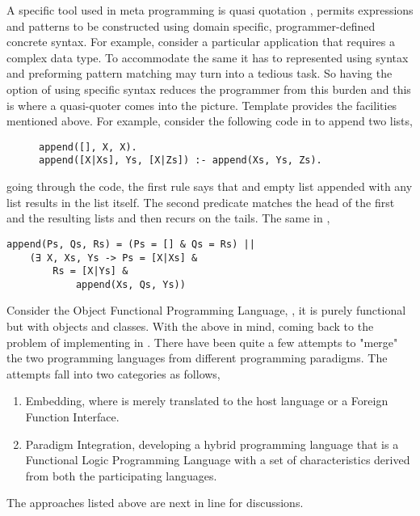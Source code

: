 \documentclass[proposal.tex]{subfiles}
\begin{document}
\par A specific tool used in meta programming is quasi quotation \cite{mainland2007s,haskellquasi,wikiquasi}, permits  expressions 
and patterns to be constructed using domain specific, programmer-defined concrete syntax. For example, consider a particular application that requires a 
complex data type. To accommodate the same it has to represented using  syntax and preforming pattern matching may turn into a 
tedious task. So having the option of using specific syntax reduces the programmer from this burden and this is where a quasi-quoter comes into the 
picture. Template  provides the facilities mentioned above. For example, consider the following code in  to append 
two lists,
\begin{figure}[h]
\begin{verbatim}
append([], X, X).
append([X|Xs], Ys, [X|Zs]) :- append(Xs, Ys, Zs).
\end{verbatim}    
\end{figure}
going through the code, the first rule says that and empty list appended with any list results in the list itself. The second predicate matches the head of the 
first and the resulting lists and then recurs on the tails. The same in ,

\begin{verbatim}
append(Ps, Qs, Rs) = (Ps = [] & Qs = Rs) ||
	(∃ X, Xs, Ys -> Ps = [X|Xs] & 
		Rs = [X|Ys] & 
			append(Xs, Qs, Ys))
\end{verbatim}  

\par Consider the Object Functional Programming Language,  \cite{website:scala}, it is purely functional but with objects 
and classes. With the above in mind, coming back to the problem of implementing  in . There have been quite a few 
attempts to "merge" the two programming languages from different programming paradigms. The attempts fall into two categories as follows,

\begin{enumerate}
\item Embedding, where  is merely translated to the host language  or a Foreign Function Interface.

\item Paradigm Integration, developing a hybrid programming language that is a Functional Logic Programming Language with a set of characteristics 
derived from both the participating languages.
\end{enumerate}

The approaches listed above are next in line for discussions.  
\end{document}
